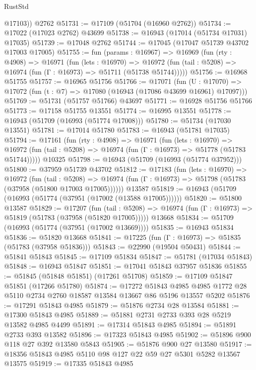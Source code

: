 \begin{lexlean}{RustStd}
\begin{coremodule}
        @17103))
    @2762
@51731 := @17109 (@51704 (@16960 @2762))
@51734 := @17022 (@17023 @2762) @43699
@51738 := @16943 (@17014 (@51734 @17031) @17035)
@51739 := @17048 @2762
@51744 := @17045 (@17047 @51739 @43702 @17003 @17005)
@51755 := fun (params : @16967) =>
  @16969
    (fun (rty : @4908) =>
    @16971
      (fun (lets : @16970) =>
      @16972 (fun (tail : @5208) => @16974 (fun (Γ : @16973) => @51711 (@51738 @51744)))))
@51756 := @16968 @51755
@51757 := @16965 @51756
@51766 := @17071
    (fun (U : @17070) => @17072 (fun (t : @7) => @17080 (@16943 (@17086 @43699 @16961) @17097)))
@51769 := @51731 (@51757 @51766) @43697
@51771 := @16928 @51756 @51766
@51773 := @17158 @51755 @13551
@51774 := @16995 @13551
@51778 := @16943 (@51709 (@16993 (@51774 @17008)))
@51780 := @51734 (@17030 @13551)
@51781 := @17014 @51780
@51783 := @16943 (@51781 @17035)
@51794 := @17161
    (fun (rty : @4908) =>
    @16971
      (fun (lets : @16970) =>
      @16972 (fun (tail : @5208) => @16974 (fun (Γ : @16973) => @51778 (@51783 @51744)))))
    @10325
@51798 := @16943 (@51709 (@16993 (@51774 @37952)))
@51800 := @37959 @51739 @43702
@51812 := @17183
    (fun (lets : @16970) =>
    @16972
      (fun (tail : @5208) =>
      @16974 (fun (Γ : @16973) => @51798 (@51783 (@37958 (@51800 @17003 @17005))))))
    @13587
@51819 := @16943 (@51709 (@16993 (@51774 (@37951 (@17002 (@13588 @17005))))))
@51820 := @51800 @13587
@51829 := @17207
    (fun (tail : @5208) => @16974 (fun (Γ : @16973) => @51819 (@51783 (@37958 (@51820 @17005)))))
    @13668
@51834 := @51709 (@16993 (@51774 (@37951 (@17002 @13669))))
@51835 := @16943 @51834
@51836 := @51820 @13668
@51841 := @17225 (fun (Γ : @16973) => @51835 (@51783 (@37958 @51836)))
@51843 := @22990 (@19504 @50431)
@51844 := @51841 @51843
@51845 := @17109 @51834
@51847 := @51781 (@17034 @51843)
@51848 := @16943 @51847
@51851 := @17041 @51843 @37957 @51836
@51855 := @51845 (@51848 @51851) (@17261 @51708)
@51859 := @17109 @51847 @51851 (@17266 @51780)
@51874 := @17272
    @51843
    @4985
    @4985
    @1772
    @28
    @5110
    @2734
    @2760
    @18587
    @13584
    @13667
    @86
    @5196
    @13557
    @5202
@51876 := @17291 @51843 @4985
@51879 := @51876 @2734 @28 @13584
@51881 := @17300 @51843 @4985
@51889 := @51881 @2731 @2733 @393 @28 @5219 @13582 @4985 @4499
@51891 := @17314 @51843 @4985
@51894 := @51891 @2733 @393 @13582
@51896 := @17323 @51843 @4985
@51902 := @51896 @900 @118 @27 @392 @13580 @5843
@51905 := @51876 @900 @27 @13580
@51917 := @18356 @51843 @4985 @5110 @98 @127 @22 @59 @27 @5301 @5282 @13567 @13575
@51919 := @17335 @51843 @4985

\end{coremodule}
\end{lexlean}
